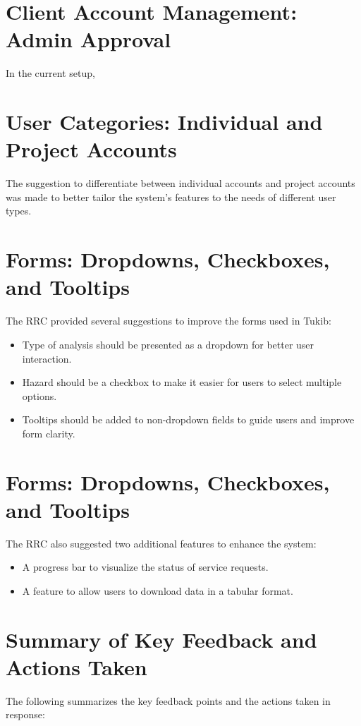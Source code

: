 \section{Client Account Management: Admin Approval}
In the current setup, 

\section{User Categories: Individual and Project Accounts}
The suggestion to differentiate between individual accounts and project accounts was made to better tailor the system’s features to the needs of different user types.

\section{Forms: Dropdowns, Checkboxes, and Tooltips}
The RRC provided several suggestions to improve the forms used in Tukib:

\begin{itemize}
	\item Type of analysis should be presented as a dropdown for better user interaction.
	\item Hazard should be a checkbox to make it easier for users to select multiple options.
	\item Tooltips should be added to non-dropdown fields to guide users and improve form clarity.
\end{itemize}

\section{Forms: Dropdowns, Checkboxes, and Tooltips}
The RRC also suggested two additional features to enhance the system:

\begin{itemize}
	\item A progress bar to visualize the status of service requests.
	\item A feature to allow users to download data in a tabular format.
\end{itemize}

\section{Summary of Key Feedback and Actions Taken}
The following summarizes the key feedback points and the actions taken in response:

